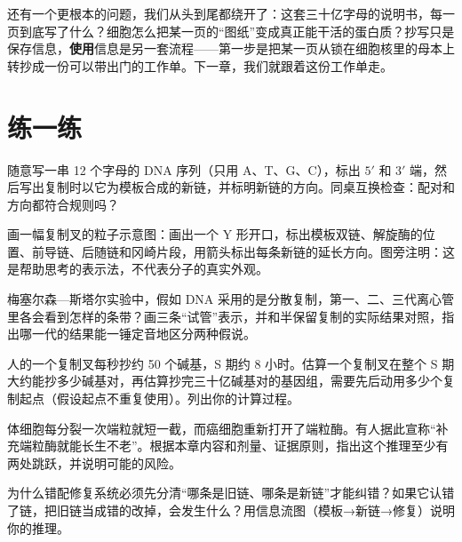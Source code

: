 还有一个更根本的问题，我们从头到尾都绕开了：这套三十亿字母的说明书，每一页到底写了什么？细胞怎么把某一页的“图纸”变成真正能干活的蛋白质？抄写只是保存信息，\textbf{使用}信息是另一套流程——第一步是把某一页从锁在细胞核里的母本上转抄成一份可以带出门的工作单。下一章，我们就跟着这份工作单走。

\section*{练一练}

\begin{sikaoti}
\item 随意写一串 12 个字母的 DNA 序列（只用 A、T、G、C），标出 $5'$ 和 $3'$ 端，然后写出复制时以它为模板合成的新链，并标明新链的方向。同桌互换检查：配对和方向都符合规则吗？
\item 画一幅复制叉的粒子示意图：画出一个 Y 形开口，标出模板双链、解旋酶的位置、前导链、后随链和冈崎片段，用箭头标出每条新链的延长方向。图旁注明：这是帮助思考的表示法，不代表分子的真实外观。
\item 梅塞尔森—斯塔尔实验中，假如 DNA 采用的是分散复制，第一、二、三代离心管里各会看到怎样的条带？画三条“试管”表示，并和半保留复制的实际结果对照，指出哪一代的结果能一锤定音地区分两种假说。
\item 人的一个复制叉每秒抄约 50 个碱基，S 期约 8 小时。估算一个复制叉在整个 S 期大约能抄多少碱基对，再估算抄完三十亿碱基对的基因组，需要先后动用多少个复制起点（假设起点不重复使用）。列出你的计算过程。
\item 体细胞每分裂一次端粒就短一截，而癌细胞重新打开了端粒酶。有人据此宣称“补充端粒酶就能长生不老”。根据本章内容和剂量、证据原则，指出这个推理至少有两处跳跃，并说明可能的风险。
\item 为什么错配修复系统必须先分清“哪条是旧链、哪条是新链”才能纠错？如果它认错了链，把旧链当成错的改掉，会发生什么？用信息流图（模板→新链→修复）说明你的推理。
\end{sikaoti}

